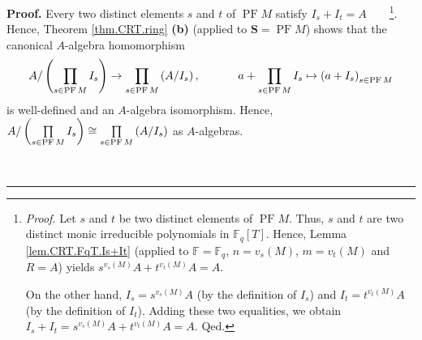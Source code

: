 \documentclass[numbers=enddot,12pt,final,onecolumn,notitlepage]{scrartcl}%
\theoremstyle{definition}
\newenvironment{proof}[1][Proof]{\noindent\textbf{#1.} }{\ \rule{0.5em}{0.5em}}
\let\prodnonlimits\prod
\renewcommand{\prod}{\prodnonlimits\limits}
\begin{document}
\begin{proof}
Every two distinct elements $s$ and $t$ of $\operatorname*{PF}M$ satisfy
$I_{s}+I_{t}=A$\ \ \ \ \footnote{\textit{Proof.} Let $s$ and $t$ be two
distinct elements of $\operatorname*{PF}M$. Thus, $s$ and $t$ are two distinct
monic irreducible polynomials in $\mathbb{F}_{q}\left[  T\right]  $. Hence,
Lemma \ref{lem.CRT.FqT.Is+It} (applied to $\mathbb{F=F}_{q}$, $n=v_{s}\left(
M\right)  $, $m=v_{t}\left(  M\right)  $ and $R=A$) yields $s^{v_{s}\left(
M\right)  }A+t^{v_{t}\left(  M\right)  }A=A$.
\par
On the other hand, $I_{s}=s^{v_{s}\left(  M\right)  }A$ (by the definition of
$I_{s}$) and $I_{t}=t^{v_{t}\left(  M\right)  }A$ (by the definition of
$I_{t}$). Adding these two equalities, we obtain $I_{s}+I_{t}=s^{v_{s}\left(
M\right)  }A+t^{v_{t}\left(  M\right)  }A=A$. Qed.}. Hence, Theorem
\ref{thm.CRT.ring} \textbf{(b)} (applied to $\mathbf{S}=\operatorname*{PF}M$)
shows that the canonical $A$-algebra homomorphism
\[
A/\left(  \prod\limits_{s\in\operatorname*{PF}M}I_{s}\right)  \rightarrow
\prod\limits_{s\in\operatorname*{PF}M}\left(  A/I_{s}\right)
,\ \ \ \ \ \ \ \ \ \ a+\prod\limits_{s\in\operatorname*{PF}M}I_{s}%
\mapsto\left(  a+I_{s}\right)  _{s\in\operatorname*{PF}M}%
\]
is well-defined and an $A$-algebra isomorphism. Hence, $A/\left(
\prod\limits_{s\in\operatorname*{PF}M}I_{s}\right)  \cong\prod\limits_{s\in
\operatorname*{PF}M}\left(  A/I_{s}\right)  $ as $A$-algebras.


\end{proof}
\end{document}
